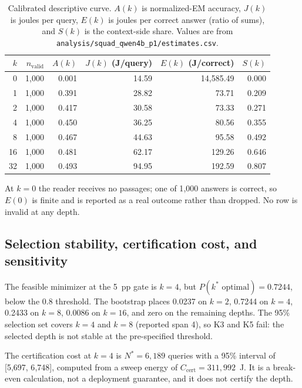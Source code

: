 \begin{table}[pos=htbp]
  \centering
  \caption{Calibrated descriptive curve. $A(k)$ is normalized-EM accuracy, $J(k)$ is joules per
  query, $E(k)$ is joules per correct answer (ratio of sums), and $S(k)$ is the context-side
  share. Values are from \texttt{analysis/squad\_qwen4b\_p1/estimates.csv}.}
  \label{tab:p1curve}
  \small
  \setlength{\tabcolsep}{4pt}
  \begin{tabular}{rrrrrr}
    \toprule
    \textbf{$k$} & \textbf{$n_{\mathrm{valid}}$} & \textbf{$A(k)$} & \textbf{$J(k)$ (J/query)} & \textbf{$E(k)$ (J/correct)} & \textbf{$S(k)$} \\
    \midrule
    0  & 1{,}000 & 0.001 & 14.59  & 14{,}585.49 & 0.000 \\
    1  & 1{,}000 & 0.391 & 28.82  & 73.71  & 0.209 \\
    2  & 1{,}000 & 0.417 & 30.58  & 73.33  & 0.271 \\
    4  & 1{,}000 & 0.450 & 36.25  & 80.56  & 0.355 \\
    8  & 1{,}000 & 0.467 & 44.63  & 95.58  & 0.492 \\
    16 & 1{,}000 & 0.481 & 62.17  & 129.26 & 0.646 \\
    32 & 1{,}000 & 0.493 & 94.95  & 192.59 & 0.807 \\
    \bottomrule
  \end{tabular}
\end{table}

At $k=0$ the reader receives no passages; one of 1{,}000 answers is correct, so $E(0)$ is finite
and is reported as a real outcome rather than dropped. No row is invalid at any depth.

\subsection{Selection stability, certification cost, and sensitivity}

The feasible minimizer at the 5~pp gate is $k=4$, but $P(k^{*}\text{ optimal})=0.7244$, below the
0.8 threshold. The bootstrap places 0.0237 on $k=2$, 0.7244 on $k=4$, 0.2433 on $k=8$, 0.0086
on $k=16$, and zero on the remaining depths. The 95\% selection set covers $k=4$ and $k=8$
(reported span 4), so K3 and K5 fail: the selected depth is not stable at the pre-specified
threshold.

The certification cost at $k=4$ is $N^{*}=6{,}189$ queries with a 95\% interval of
[5{,}697, 6{,}748], computed from a sweep energy of $C_{\mathrm{cert}}=311{,}992$~J. It is a
break-even calculation, not a deployment guarantee, and it does not certify the depth.

